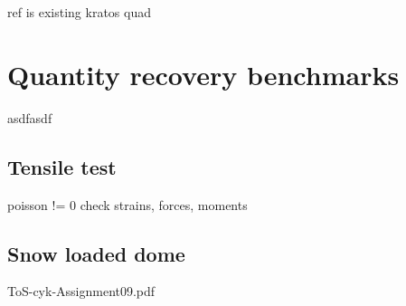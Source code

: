  

ref is existing kratos quad

\section{Quantity recovery benchmarks}

asdfasdf

\subsection{Tensile test}

poisson != 0
check strains, forces, moments

\subsection{Snow loaded dome}

ToS-cyk-Assignment09.pdf

